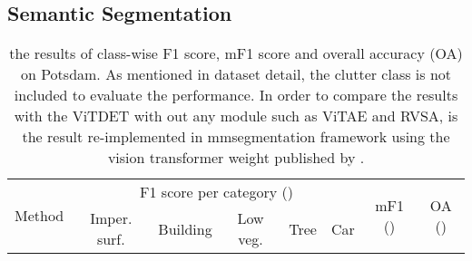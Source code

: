 \subsection{Semantic Segmentation}

\begin{table*}[t]{\textwidth=0mm}
    \centering
    \caption{the results of class-wise F1 score, mF1 score and overall accuracy (OA) on Potsdam. As mentioned in dataset detail, the clutter class is not included to evaluate the performance. In order to compare the results with the ViTDET with out any module such as ViTAE and RVSA,  is the result re-implemented in mmsegmentation framework using the vision transformer weight published by \cite{wang2022advancing}.}
    \renewcommand{\arraystretch}{1.0}
    {
    \begin{tabular}{l|c c c c c | c | c}
    
        \hline
       
       
       \multirow{2}{*}{Method} & \multicolumn{5}{c|}{F1 score per category ()} & \multirow{2}{*}{mF1 ()} & \multirow{2}{*}{OA ()} \\ \cline{2-6}
        & Imper. surf. & Building & Low veg. & Tree & Car & &  \\ \hline


\end{tabular}}
\end{table*}
